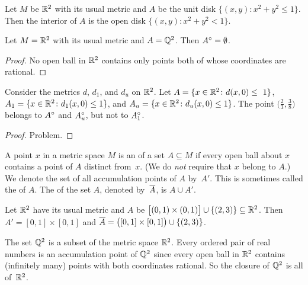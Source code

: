 \begin{exam} Let $M$ be $\mathbb{R}^2$ with its usual metric and $A$ be the unit disk $\{(x,y) \colon x^2 + y^2 \le 1\}$.
Then the interior of $A$ is the open disk $\{(x,y) \colon x^2 + y^2 < 1\}$.
\end{exam}

\begin{exam} Let $M = \mathbb{R}^2$ with its usual metric and $A = \mathbb{Q}^2$.  Then $A^{\circ} = \emptyset$.
\end{exam}

\begin{proof} No open ball in $\mathbb{R}^2$ contains only points both of whose coordinates are rational.
\end{proof}

\begin{exam} Consider the metrics $d$, $d_1$, and $d_u$ on $\mathbb{R}^2$. Let $A = \{x \in \mathbb{R}^2
\colon d(x,0) \le~1\}$, $A_1 = \{x \in \mathbb{R}^2 \colon d_1(x,0) \le 1\}$, and $A_u = \{x \in \mathbb{R}^2
\colon d_u(x,0) \le 1\}$.  The point $\bigl(\frac23,\frac38\bigr)$ belongs to $A^{\circ}$ and
$A_u^{\circ}$, but not to $A_1^{\circ}$.
\end{exam}

\begin{proof} Problem.  \ns  \end{proof}

\begin{defn} A point $x$ in a metric space $M$ is an
 of a set $A \subseteq M$ if every open ball about $x$ contains a point
of $A$ distinct from~$x$. (We do \emph{not} require that $x$ belong to $A$.) We denote the set
of all accumulation points of $A$
by~$A'$. This is sometimes called
the
 of $A$. The
 of the set $A$, denoted
by~$\overline{A}$, is $A \cup A'$.
\end{defn}

\begin{exam} Let $\mathbb{R}^2$ have its usual metric and $A$ be $\bigl[(0,1) \times (0,1)\bigr] \cup
\{(2,3)\} \subseteq \mathbb{R}^2$.  Then $A' = [0,1] \times [0,1]$ and $\overline{A} =\bigl([0,1] \times
[0,1]\bigr) \cup \{(2,3)\}$.
\end{exam}

\begin{exam} The set $\mathbb{Q}^2$ is a subset of the metric space $\mathbb{R}^2$.  Every ordered pair of real
numbers is an accumulation point of $\mathbb{Q}^2$ since every open ball in $\mathbb{R}^2$ contains
(infinitely many) points with both coordinates rational.  So the closure of $\mathbb{Q}^2$ is all
of~$\mathbb{R}^2$.
\end{exam}

